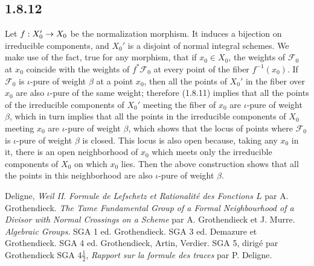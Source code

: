 \documentclass[deligne.tex]{subfiles}
\begin{document}
\subsection*{1.8.12}
Let $f:X_0'\rightarrow X_0$ be the normalization morphism.
It induces a bijection on irreducible components, and $X_0'$ is a disjoint
of normal integral schemes.
We make use of the fact, true for any morphism, that if $x_0\in X_0$,
the weights of $\mathscr F_0$ at $x_0$ coincide with the weights of 
$f^\ast\mathscr F_0$ at every point of the fiber $f^{-1}(x_0)$.
If $\mathscr F_0$ is $\iota$-pure of weight $\beta$ at a point
$x_0$, then all the points of $X_0'$ in the fiber over $x_0$ are also
$\iota$-pure of the same weight; therefore (1.8.11) implies that all the
points of the irreducible components of $X_0'$ meeting the fiber of $x_0$
are $\iota$-pure of weight $\beta$, which in turn implies that all the 
points in the irreducible components of $X_0$ meeting $x_0$ are
$\iota$-pure of weight $\beta$, which shows that the locus of points where
$\mathscr F_0$ is $\iota$-pure of weight $\beta$ is closed.
This locus is also open because, taking any $x_0$ in it, there is an 
open neighborhood of $x_0$ which meets only the irreducible components of
$X_0$ on which $x_0$ lies. Then the above construction shows that all the
points in this neighborhood are also $\iota$-pure of weight $\beta$.

\begin{thebibliography}{SGAA}
 Deligne, \textit{Weil II}.
 \textit{Formule de Lefschetz et Rationalité des Fonctions
$L$} par A. Grothendieck.
 \textit{The Tame Fundamental Group of a Formal Neighbourhood of a Divisor with Normal Crossings on a Scheme}
par A. Grothendieck et J. Murre.
 \textit{Algebraic Groups}.
 SGA 1 ed. Grothendieck.
 SGA 3 ed. Demazure et Grothendieck.
 SGA 4 ed. Grothendieck, Artin, Verdier.
 SGA 5, dirigé par Grothendieck
SGA 4$\frac{1}{2}$, \textit{Rapport sur la formule des traces} par P. Deligne.
\end{thebibliography}
\end{document}
